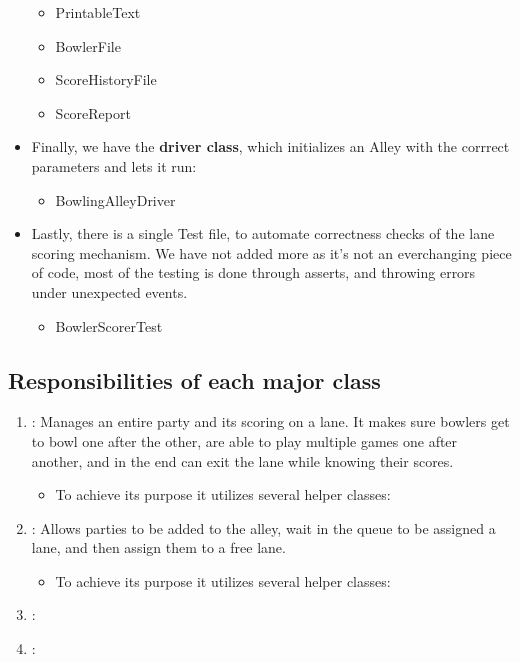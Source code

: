 \begin{itemize}
\begin{itemize}
              \item PrintableText
              \item BowlerFile
              \item ScoreHistoryFile
              \item ScoreReport
          \end{itemize}
    \item Finally, we have the \textbf{driver class}, which initializes an Alley with the corrrect parameters and lets it run:
          \begin{itemize}
              \item BowlingAlleyDriver
          \end{itemize}
    \item Lastly, there is a single Test file, to automate correctness checks of the lane scoring mechanism. We have not added more as it's not an everchanging piece of code, most of the testing is done through asserts, and throwing errors under unexpected events.
          \begin{itemize}
              \item BowlerScorerTest
          \end{itemize}
\end{itemize}

\subsection{Responsibilities of each major class}

\begin{enumerate}
    \item {}: Manages an entire party and its scoring on a lane. It makes sure bowlers get to bowl one after the other, are able to play multiple games one after another, and in the end can exit the lane while knowing their scores.
    \begin{itemize}
        \item To achieve its purpose it utilizes several helper classes:
    \end{itemize}
    \item {}: Allows parties to be added to the alley, wait in the queue to be assigned a lane, and then assign them to a free lane.
    \begin{itemize}
        \item To achieve its purpose it utilizes several helper classes:
    \end{itemize}
    \item {}:
    \item {}:
\end{enumerate}

